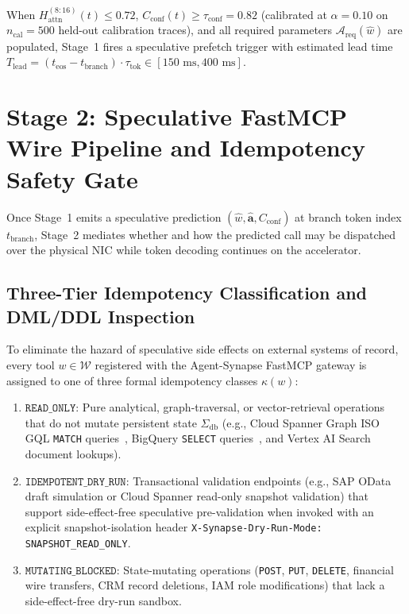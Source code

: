 \documentclass[10pt,conference]{IEEEtran}
\begin{document}
When $H_{\text{attn}}^{(8:16)}(t) \le 0.72$, $C_{\text{conf}}(t) \ge \tau_{\text{conf}} = 0.82$ (calibrated at $\alpha = 0.10$ on $n_{\text{cal}} = 500$ held-out calibration traces), and all required parameters $\mathcal{A}_{\text{req}}(\hat{w})$ are populated, Stage~1 fires a speculative prefetch trigger with estimated lead time $T_{\text{lead}} = (t_{\text{eos}} - t_{\text{branch}}) \cdot \tau_{\text{tok}} \in [150\text{ ms}, 400\text{ ms}]$.

\section{Stage 2: Speculative FastMCP Wire Pipeline and Idempotency Safety Gate}
\label{sec:stage2}

Once Stage~1 emits a speculative prediction $(\hat{w}, \hat{\mathbf{a}}, C_{\text{conf}})$ at branch token index $t_{\text{branch}}$, Stage~2 mediates whether and how the predicted call may be dispatched over the physical NIC while token decoding continues on the accelerator.

\subsection{Three-Tier Idempotency Classification and DML/DDL Inspection}
To eliminate the hazard of speculative side effects on external systems of record, every tool $w \in \mathcal{W}$ registered with the Agent-Synapse FastMCP gateway is assigned to one of three formal idempotency classes $\kappa(w)$:
\begin{enumerate}
    \item $\texttt{READ\_ONLY}$: Pure analytical, graph-traversal, or vector-retrieval operations that do not mutate persistent state $\Sigma_{\text{db}}$ (e.g., Cloud Spanner Graph ISO GQL \texttt{MATCH} queries~\cite{corbett2012spanner, iso2024gql}, BigQuery \texttt{SELECT} queries~\cite{melnik2010dremel}, and Vertex AI Search document lookups).
    \item $\texttt{IDEMPOTENT\_DRY\_RUN}$: Transactional validation endpoints (e.g., SAP OData draft simulation or Cloud Spanner read-only snapshot validation) that support side-effect-free speculative pre-validation when invoked with an explicit snapshot-isolation header \texttt{X-Synapse-Dry-Run-Mode: SNAPSHOT\_READ\_ONLY}.
    \item $\texttt{MUTATING\_BLOCKED}$: State-mutating operations (\texttt{POST}, \texttt{PUT}, \texttt{DELETE}, financial wire transfers, CRM record deletions, IAM role modifications) that lack a side-effect-free dry-run sandbox.
\end{enumerate}
\end{document}
